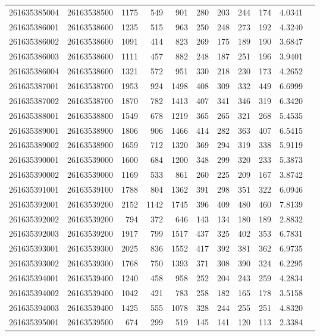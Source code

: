 \documentclass[11pt,landscape]{article}
\begin{document}
{\begin{longtable}[]{@{}lrrrrrrrrrr@{}}
261635385004 & 26163538500 & 1175 & 549 & 901 & 280 & 203 & 244 & 174 & 4.0341 \\
261635386001 & 26163538600 & 1235 & 515 & 963 & 250 & 248 & 273 & 192 & 4.3240 \\
261635386002 & 26163538600 & 1091 & 414 & 823 & 269 & 175 & 189 & 190 & 3.6847 \\
261635386003 & 26163538600 & 1111 & 457 & 882 & 248 & 187 & 251 & 196 & 3.9401 \\
261635386004 & 26163538600 & 1321 & 572 & 951 & 330 & 218 & 230 & 173 & 4.2652 \\
261635387001 & 26163538700 & 1953 & 924 & 1498 & 408 & 309 & 332 & 449 & 6.6999 \\
261635387002 & 26163538700 & 1870 & 782 & 1413 & 407 & 341 & 346 & 319 & 6.3420 \\
261635388001 & 26163538800 & 1549 & 678 & 1219 & 365 & 265 & 321 & 268 & 5.4535 \\
261635389001 & 26163538900 & 1806 & 906 & 1466 & 414 & 282 & 363 & 407 & 6.5415 \\
261635389002 & 26163538900 & 1659 & 712 & 1320 & 369 & 294 & 319 & 338 & 5.9119 \\
261635390001 & 26163539000 & 1600 & 684 & 1200 & 348 & 299 & 320 & 233 & 5.3873 \\
261635390002 & 26163539000 & 1169 & 533 & 861 & 260 & 225 & 209 & 167 & 3.8742 \\
261635391001 & 26163539100 & 1788 & 804 & 1362 & 391 & 298 & 351 & 322 & 6.0946 \\
261635392001 & 26163539200 & 2152 & 1142 & 1745 & 396 & 409 & 480 & 460 & 7.8139 \\
261635392002 & 26163539200 & 794 & 372 & 646 & 143 & 134 & 180 & 189 & 2.8832 \\
261635392003 & 26163539200 & 1917 & 799 & 1517 & 437 & 325 & 402 & 353 & 6.7831 \\
261635393001 & 26163539300 & 2025 & 836 & 1552 & 417 & 392 & 381 & 362 & 6.9735 \\
261635393002 & 26163539300 & 1768 & 750 & 1393 & 371 & 308 & 390 & 324 & 6.2295 \\
261635394001 & 26163539400 & 1240 & 458 & 958 & 252 & 204 & 243 & 259 & 4.2834 \\
261635394002 & 26163539400 & 1042 & 421 & 783 & 258 & 182 & 165 & 178 & 3.5158 \\
261635394003 & 26163539400 & 1425 & 555 & 1078 & 328 & 244 & 255 & 251 & 4.8320 \\
261635395001 & 26163539500 & 674 & 299 & 519 & 145 & 141 & 120 & 113 & 2.3384 \\

\end{longtable}}
\end{document}

